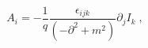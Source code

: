 \begin{equation}
A_{i}=-\frac{1}{q}\frac{\epsilon _{ijk}}{\left( -\partial ^{2}+m^{2}\right) }%
\partial _{j}I_{k}\;,  \label{ldv}
\end{equation}

